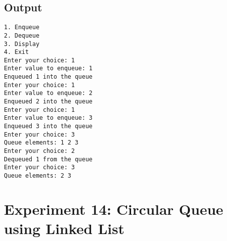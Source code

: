 \documentclass[12pt,a4paper]{article}
\begin{document}
\subsection*{Output}
\begin{tcolorbox}[terminalstyle, title=Sample Output]
\texttt{1. Enqueue\\2. Dequeue\\3. Display\\4. Exit\\
Enter your choice: 1\\
Enter value to enqueue: 1\\
Enqueued 1 into the queue\\
Enter your choice: 1\\
Enter value to enqueue: 2\\
Enqueued 2 into the queue\\
Enter your choice: 1\\
Enter value to enqueue: 3\\
Enqueued 3 into the queue\\
Enter your choice: 3\\
Queue elements: 1 2 3\\
Enter your choice: 2\\
Dequeued 1 from the queue\\
Enter your choice: 3\\
Queue elements: 2 3}
\end{tcolorbox}

\newpage
\section*{Experiment 14: Circular Queue using Linked List}
\end{document}
